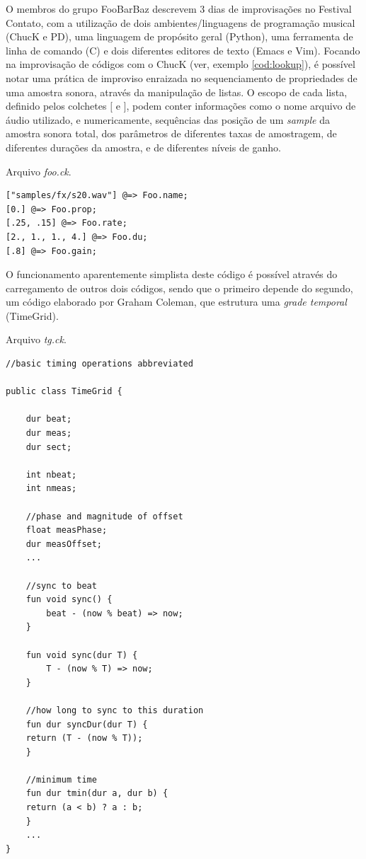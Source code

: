 O membros do grupo FooBarBaz descrevem 3 dias de improvisações no Festival Contato, com a utilização de dois ambientes/linguagens de programação musical (ChucK e PD), uma linguagem de propósito geral (Python), uma ferramenta de linha de comando (C) e dois diferentes editores de texto (Emacs e Vim). Focando na improvisação de códigos com o ChucK (ver, exemplo \ref{cod:lookup}), é possível notar uma prática de improviso enraizada no sequenciamento de propriedades de uma amostra sonora, através da manipulação de listas. O escopo de cada lista, definido pelos colchetes $[$ e $]$, podem conter informações como o nome arquivo de áudio utilizado, e numericamente, sequências das posição de um \emph{sample} da amostra sonora total, dos parâmetros de diferentes taxas de amostragem, de diferentes durações da amostra, e de diferentes níveis de ganho. 

\begin{example}{Arquivo \emph{foo.ck}.}\label{cod:lookup}
\begin{verbatim}
["samples/fx/s20.wav"] @=> Foo.name;
[0.] @=> Foo.prop;
[.25, .15] @=> Foo.rate;
[2., 1., 1., 4.] @=> Foo.du;
[.8] @=> Foo.gain;
\end{verbatim}
\end{example}

O funcionamento aparentemente simplista deste código é possível através do carregamento de outros dois códigos, sendo que o primeiro depende do segundo, um código elaborado por Graham Coleman, que estrutura uma \emph{grade temporal} (TimeGrid).

\begin{example}{Arquivo \emph{tg.ck}.}\label{cod:tg}
\begin{verbatim}
//basic timing operations abbreviated

public class TimeGrid {

    dur beat;
    dur meas;
    dur sect;

    int nbeat;
    int nmeas;

    //phase and magnitude of offset
    float measPhase;
    dur measOffset;
    ...

    //sync to beat
    fun void sync() {
        beat - (now % beat) => now;
    }

    fun void sync(dur T) {
        T - (now % T) => now;
    }

    //how long to sync to this duration
    fun dur syncDur(dur T) {
	return (T - (now % T));
    }

    //minimum time
    fun dur tmin(dur a, dur b) {
	return (a < b) ? a : b;
    }
    ...
}
\end{verbatim}  
\end{example}

